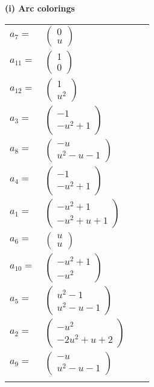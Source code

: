 \documentclass[1p]{elsarticle_modified}
\theoremstyle{definition}
\begin{document}
\flushleft \textbf{(i) Arc colorings}\\
\begin{tabular}{m{7pt} m{180pt} m{7pt} m{180pt} }
\flushright $a_{7}=$&$\begin{pmatrix}0\\u\end{pmatrix}$ \\
\flushright $a_{11}=$&$\begin{pmatrix}1\\0\end{pmatrix}$ \\
\flushright $a_{12}=$&$\begin{pmatrix}1\\u^2\end{pmatrix}$ \\
\flushright $a_{3}=$&$\begin{pmatrix}-1\\- u^2+1\end{pmatrix}$ \\
\flushright $a_{8}=$&$\begin{pmatrix}- u\\u^2- u-1\end{pmatrix}$ \\
\flushright $a_{4}=$&$\begin{pmatrix}-1\\- u^2+1\end{pmatrix}$ \\
\flushright $a_{1}=$&$\begin{pmatrix}- u^2+1\\- u^2+u+1\end{pmatrix}$ \\
\flushright $a_{6}=$&$\begin{pmatrix}u\\u\end{pmatrix}$ \\
\flushright $a_{10}=$&$\begin{pmatrix}- u^2+1\\- u^2\end{pmatrix}$ \\
\flushright $a_{5}=$&$\begin{pmatrix}u^2-1\\u^2- u-1\end{pmatrix}$ \\
\flushright $a_{2}=$&$\begin{pmatrix}- u^2\\-2 u^2+u+2\end{pmatrix}$ \\
\flushright $a_{9}=$&$\begin{pmatrix}- u\\u^2- u-1\end{pmatrix}$\\&\end{tabular}
\end{document}
